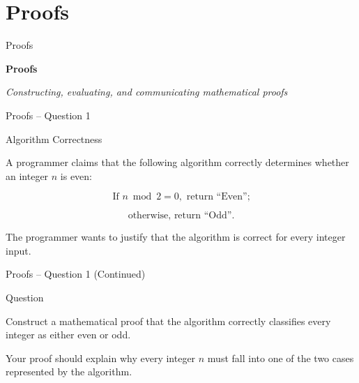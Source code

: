 
\section{Proofs}


\begin{frame}{Proofs}

\begin{center}

\vspace{1cm}

{\Huge\textbf{Proofs}}

\vspace{0.6cm}

\textit{Constructing, evaluating, and communicating mathematical proofs}

\end{center}

\end{frame}


\begin{frame}{Proofs -- Question 1}

\begin{block}{Algorithm Correctness}

A programmer claims that the following algorithm correctly determines
whether an integer $n$ is even:

\[
\text{If } n \bmod 2 = 0,\text{ return ``Even'';}
\]

\[
\text{otherwise, return ``Odd''.}
\]

The programmer wants to justify that the algorithm is correct for every
integer input.

\end{block}

\end{frame}


\begin{frame}{Proofs -- Question 1 (Continued)}

\begin{block}{Question}

Construct a mathematical proof that the algorithm correctly classifies
every integer as either even or odd.

\medskip

Your proof should explain why every integer $n$ must fall into one of the
two cases represented by the algorithm.

\end{block}

\end{frame}


